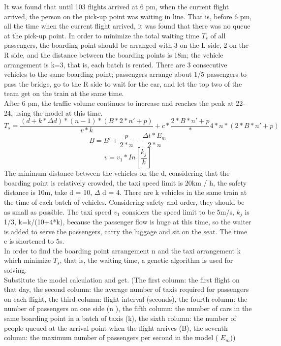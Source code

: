 It was found that until 103 flights arrived at 6 pm, when the current flight arrived, the person on the pick-up point was waiting in line. That is, before 6 pm, all the time when the current flight arrived, it was found that there was no queue at the pick-up point. In order to minimize the total waiting time $T_s$ of all passengers, the boarding point should be arranged with 3 on the L side, 2 on the R side, and the distance between the boarding points is 18m; the vehicle arrangement is k=3, that is, each batch is rented. There are 3 consecutive vehicles to the same boarding point; passengers arrange about 1/5 passengers to pass the bridge, go to the R side to wait for the car, and let the top two of the team get on the train at the same time.\\
\indent After 6 pm, the traffic volume continues to increase and reaches the peak at 22-24, using the model at this time.
\begin{equation} T_{s} = \frac{{(d+k*\Delta d)}*{(n-1)}*{(B*2*n'+p)}}{v*k}+c*\frac{2*B*n'+p}*{4*n}*{(2*B*n'+p)}\end{equation}
\begin{equation} B =B'+\frac{p}{2*n}-\frac{\Delta t*E_m}{2*n} \end{equation}
\begin{equation} v =v_1 * In[\frac{k_j}{k}]\end{equation}
\indent The minimum distance between the vehicles on the d, considering that the boarding point is relatively crowded, the taxi speed limit is 20km / h, the safety distance is 10m, take d = 10, $\Delta$ d = 4. There are k vehicles in the same train at the time of each batch of vehicles. Considering safety and order, they should be as small as possible. The taxi speed $v_1$ considers the speed limit to be 5m/s, $k_j$ is 1/3, k=k/(10+4*k), because the passenger flow is huge at this time, so the waiter is added to serve the passengers, carry the luggage and sit on the seat. The time c is shortened to 5s.\\
\indent In order to find the boarding point arrangement n and the taxi arrangement k which minimize $T_s$, that is, the waiting time, a genetic algorithm is used for solving.\\
\indent Substitute the model calculation and get. (The first column: the first flight on that day, the second column: the average number of taxis required for passengers on each flight, the third column: flight interval (seconds), the fourth column: the number of passengers on one side (n ), the fifth column: the number of cars in the same boarding point in a batch of taxis (k), the sixth column: the number of people queued at the arrival point when the flight arrives (B), the seventh column: the maximum number of passengers per second in the model ( $E_m$))
